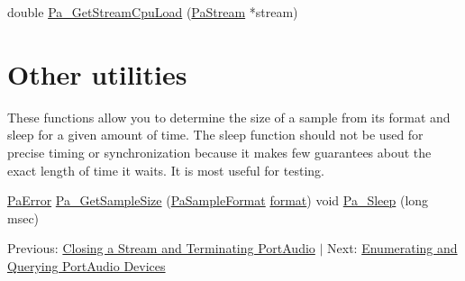 \begin{DoxyCode}
\textcolor{keywordtype}{double}  \hyperlink{portaudio_8h_a83b8c624464dd7bb6a01b06ab596c115}{Pa\_GetStreamCpuLoad} (\hyperlink{portaudio_8h_a19874734f89958fccf86785490d53b4c}{PaStream} *stream)
\end{DoxyCode}
\hypertarget{utility_functions_tut_util7}{}\section{Other utilities}\label{utility_functions_tut_util7}
These functions allow you to determine the size of a sample from its format and sleep for a given amount of time. The sleep function should not be used for precise timing or synchronization because it makes few guarantees about the exact length of time it waits. It is most useful for testing.


\begin{DoxyCode}
\hyperlink{portaudio_8h_a4949e4a8ef9f9dbe8cbee414ce69841d}{PaError} \hyperlink{portaudio_8h_a541ed0b734df2631bc4c229acf92abc1}{Pa\_GetSampleSize} (\hyperlink{portaudio_8h_a4582d93c2c2e60e12be3d74c5fe00b96}{PaSampleFormat} 
      \hyperlink{_export_p_c_m_8cpp_a317afff57d87a89158c2b038d37b2b08}{format})
\textcolor{keywordtype}{void}    \hyperlink{portaudio_8h_a1b3c20044c9401c42add29475636e83d}{Pa\_Sleep} (\textcolor{keywordtype}{long} msec)
\end{DoxyCode}


Previous\+: \hyperlink{terminating_portaudio}{Closing a Stream and Terminating Port\+Audio} $\vert$ Next\+: \hyperlink{querying_devices}{Enumerating and Querying Port\+Audio Devices} 